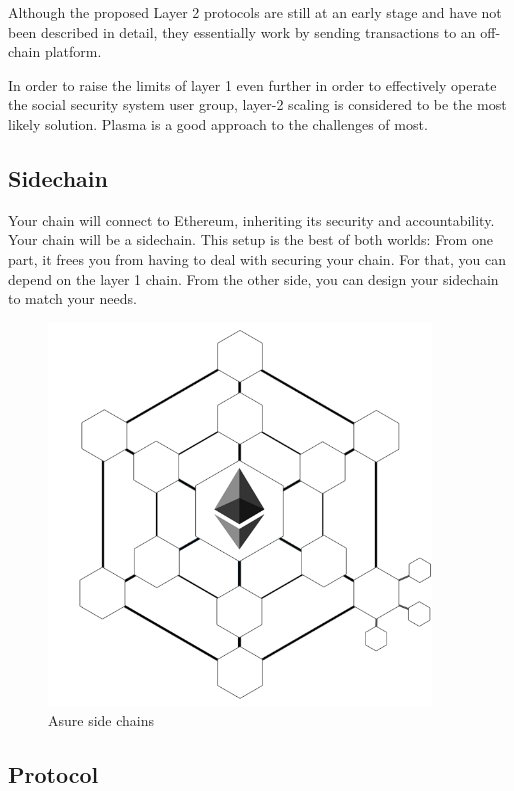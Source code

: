 Although the proposed Layer 2 protocols are still at an early stage and have not been described in detail, they essentially work by sending transactions to an off-chain platform. 

In order to raise the limits of layer 1 even further in order to effectively operate the social security system user group, layer-2 scaling is considered to be the most likely solution. Plasma is a good approach to the challenges of most.

\subsection{Sidechain}

Your chain will connect to Ethereum, inheriting its security and accountability. Your chain will be a sidechain.
\newline
This setup is the best of both worlds: From one part, it frees you from having to deal with securing your chain. For that, you can depend on the layer 1 chain.
\newline
From the other side, you can design your sidechain to match your needs.


\begin{figure}
    \centering
    \includegraphics[width=4.0in]{side-chain.png}
    \caption{Asure side chains}
    \label{fig:side_chain}
\end{figure}

\subsection{Protocol}

